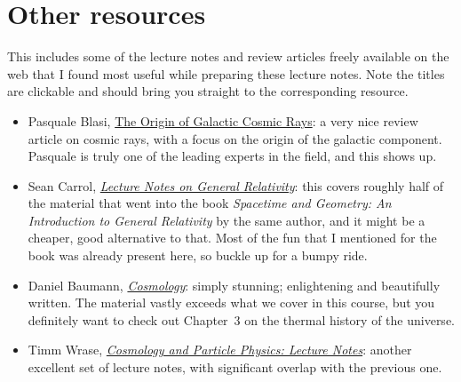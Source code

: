 \section*{Other resources}

This includes some of the lecture notes and review articles freely available on the
web that I found most useful while preparing these lecture notes. Note the titles
are clickable and should bring you straight to the corresponding resource.


\begin{itemize}
    \item Pasquale Blasi,
    \href{https://arxiv.org/abs/1311.7346}{The Origin of Galactic Cosmic Rays}:
    a very nice review article on cosmic rays, with a focus on the origin of the
    galactic component. Pasquale is truly one of the leading experts in the field,
    and this shows up.
    \item Sean Carrol,
    \href{https://arxiv.org/abs/gr-qc/9712019}{\emph{Lecture Notes on General Relativity}}:
    this covers roughly half of the material that went into the book
    \emph{Spacetime and Geometry: An Introduction to General Relativity}
    by the same author, and it might be a cheaper, good alternative to that. Most
    of the fun that I mentioned for the book was already present here, so buckle up
    for a bumpy ride.
    \item Daniel Baumann,
    \href{http://cosmology.amsterdam/education/cosmology/}{\emph{Cosmology}}:
    simply stunning; enlightening and beautifully written. The material vastly exceeds
    what we cover in this course, but you definitely want to check out Chapter~3
    on the thermal history of the universe.
    \item Timm Wrase,
    \href{http://hep.itp.tuwien.ac.at/~wrasetm/cosmology2019.html}{\emph{Cosmology and Particle Physics: Lecture Notes}}:
    another excellent set of lecture notes, with significant overlap with the previous
    one.
\end{itemize}
